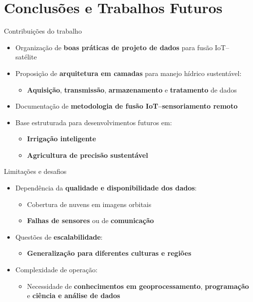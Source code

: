 \documentclass[aspectratio=169]{beamer}
\begin{document}
\section{Conclusões e Trabalhos Futuros}

\begin{frame}{Contribuições do trabalho}
  \begin{itemize}
    \item Organização de \textbf{boas práticas de projeto de dados} para fusão IoT--satélite
    \item Proposição de \textbf{arquitetura em camadas} para manejo hídrico sustentável:
      \begin{itemize}
        \item \textbf{Aquisição}, \textbf{transmissão}, \textbf{armazenamento} e \textbf{tratamento} de dados
      \end{itemize}
    \item Documentação de \textbf{metodologia de fusão IoT--sensoriamento remoto}
    \item Base estruturada para desenvolvimentos futuros em:
      \begin{itemize}
        \item \textbf{Irrigação inteligente}
        \item \textbf{Agricultura de precisão sustentável}
      \end{itemize}
  \end{itemize}
\end{frame}

\begin{frame}{Limitações e desafios}
  \begin{itemize}
    \item Dependência da \textbf{qualidade e disponibilidade dos dados}:
      \begin{itemize}
        \item Cobertura de nuvens em imagens orbitais
        \item \textbf{Falhas de sensores} ou de \textbf{comunicação}
      \end{itemize}
    \item Questões de \textbf{escalabilidade}:
      \begin{itemize}
        \item \textbf{Generalização para diferentes culturas e regiões}
      \end{itemize}
    \item Complexidade de operação:
      \begin{itemize}
        \item Necessidade de \textbf{conhecimentos em geoprocessamento}, \textbf{programação} e \textbf{ciência e análise de dados}
      \end{itemize}
  \end{itemize}
\end{frame}
\end{document}

